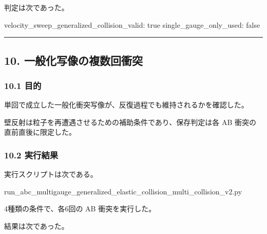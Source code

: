\documentclass[
  a4paper,
]{article}
\newenvironment{Shaded}{}{}
\newcommand{\NormalTok}[1]{#1}
\begin{document}
判定は次であった。

\begin{Shaded}
\begin{Highlighting}[]
\NormalTok{velocity\_sweep\_generalized\_collision\_valid: true}
\NormalTok{single\_gauge\_only\_used: false}
\end{Highlighting}
\end{Shaded}

\begin{center}\rule{0.5\linewidth}{0.5pt}\end{center}

\subsection{10.
一般化写像の複数回衝突}\label{ux4e00ux822cux5316ux5199ux50cfux306eux8907ux6570ux56deux885dux7a81}

\subsubsection{10.1 目的}\label{ux76eeux7684-1}

単回で成立した一般化衝突写像が、反復過程でも維持されるかを確認した。

壁反射は粒子を再遭遇させるための補助条件であり、保存判定は各 AB
衝突の直前直後に限定した。

\subsubsection{10.2 実行結果}\label{ux5b9fux884cux7d50ux679c-2}

実行スクリプトは次である。

\begin{Shaded}
\begin{Highlighting}[]
\NormalTok{run\_abc\_multigauge\_generalized\_elastic\_collision\_multi\_collision\_v2.py}
\end{Highlighting}
\end{Shaded}

4種類の条件で、各6回の AB 衝突を実行した。

結果は次であった。
\end{document}
